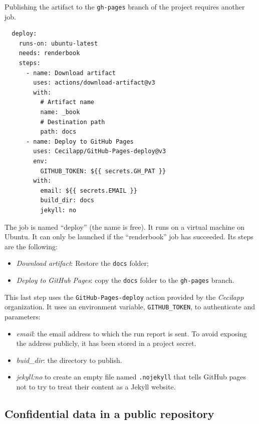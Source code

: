 \documentclass[
  12pt,
  american,
  a4paper,
  extrafontsizes,onecolumn,openright
  ]{memoir}
\providecommand{\tightlist}{%
  \setlength{\itemsep}{0pt}\setlength{\parskip}{0pt}}
\begin{document}
Publishing the artifact to the \texttt{gh-pages} branch of the project requires another job.

\begin{verbatim}
  deploy:
    runs-on: ubuntu-latest
    needs: renderbook
    steps:
      - name: Download artifact
        uses: actions/download-artifact@v3
        with:
          # Artifact name
          name: _book
          # Destination path
          path: docs
      - name: Deploy to GitHub Pages
        uses: Cecilapp/GitHub-Pages-deploy@v3
        env:
          GITHUB_TOKEN: ${{ secrets.GH_PAT }}
        with:
          email: ${{ secrets.EMAIL }}
          build_dir: docs
          jekyll: no
\end{verbatim}

The job is named \enquote{deploy} (the name is free).
It runs on a virtual machine on Ubuntu.
It can only be launched if the \enquote{renderbook} job has succeeded.
Its steps are the following:

\begin{itemize}
\tightlist
\item
  \emph{Download artifact}: Restore the \texttt{docs} folder;
\item
  \emph{Deploy to GitHub Pages}: copy the \texttt{docs} folder to the \texttt{gh-pages} branch.
\end{itemize}

This last step uses the \texttt{GitHub-Pages-deploy} action provided by the \emph{Cecilapp} organization.
It uses an environment variable, \texttt{GITHUB\_TOKEN}, to authenticate and parameters:

\begin{itemize}
\tightlist
\item
  \emph{email}: the email address to which the run report is sent.
  To avoid exposing the address publicly, it has been stored in a project secret.
\item
  \emph{buid\_dir}: the directory to publish.
\item
  \emph{jekyll:no} to create an empty file named \texttt{.nojekyll} that tells GitHub pages not to try to treat their content as a Jekyll website.
\end{itemize}

\hypertarget{sec:confidentielCI}{%
\subsection{Confidential data in a public repository}\label{sec:confidentielCI}}
\end{document}
